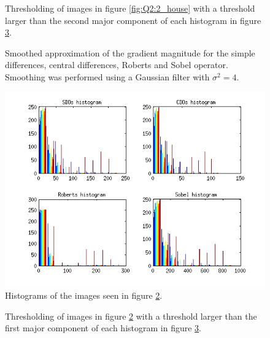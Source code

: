 \begin{figure}[H]
	\centering
	\scalebox{0.9}{}
	\caption{Thresholding of images in figure \ref{fig:Q2:2_house} with a threshold larger than the second major component of
	each histogram in figure \ref{fig:Q2:histogram_house}.}
	\label{fig:Q2:threshold_house_2}
\end{figure}


\begin{figure}[H]
	\centering
	\scalebox{0.7}{}
	\caption{Smoothed approximation of the gradient magnitude for the simple differences, central differences, Roberts and Sobel operator. Smoothing
	was performed using a Gaussian filter with $\sigma^2 = 4$.}
	\label{fig:Q2:2_house_smoothed}
\end{figure}

\begin{figure}[H]
	\centering
	\includegraphics[scale=0.8]{./images/Q2/house_smoothed/histogram_2.png}
	\caption{Histograms of the images seen in figure \ref{fig:Q2:2_house_smoothed}.}
	\label{fig:Q2:histogram_house}
\end{figure}


\begin{figure}[H]
	\centering
	\scalebox{0.9}{}
	\caption{Thresholding of images in figure \ref{fig:Q2:2_house_smoothed} with a threshold larger than the first major component of
	each histogram in figure \ref{fig:Q2:histogram_house}.}
	\label{fig:Q2:threshold_house_1}
\end{figure}


